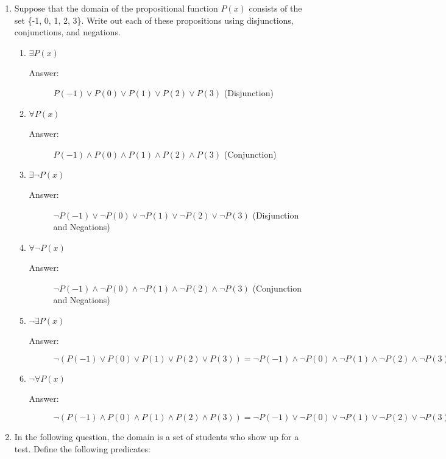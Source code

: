 \documentclass[12pt, oneside]{article}
\begin{document}
\begin{enumerate}
 \item Suppose that the domain of the propositional function $P(x)$ consists of the set \{-1, 0, 1, 2, 3\}. Write out each of these propositions using disjunctions, conjunctions, and negations.
\begin{enumerate}
    \item $\exists P(x) $
    \begin{description}
        \item[Answer:] $P(-1) \lor P(0) \lor P(1) \lor P(2) \lor P(3)$ (Disjunction)
    \end{description}
    \item $\forall P(x)$
    \begin{description}
        \item[Answer:] $P(-1) \land P(0) \land P(1) \land P(2) \land P(3)$ (Conjunction)
    \end{description}
    \item $\exists \neg P(x) $
    \begin{description}
        \item[Answer:] $\lnot P(-1) \lor\lnot P(0) \lor\lnot P(1) \lor\lnot P(2) \lor\lnot P(3)$ (Disjunction and Negations)
    \end{description}
    \item $\forall \neg P(x)$
    \begin{description}
        \item[Answer:] $\lnot P(-1) \land\lnot P(0) \land\lnot P(1) \land\lnot P(2) \land\lnot P(3)$ (Conjunction and Negations)
    \end{description}
    \item $\neg \exists P(x) $
    \begin{description}
        \item[Answer:] $\lnot(P(-1) \lor P(0) \lor P(1) \lor P(2) \lor P(3)) = \lnot P(-1) \land\lnot P(0) \land\lnot P(1) \land\lnot P(2) \land\lnot P(3)$
    \end{description}
    \item $\neg \forall P(x)$
    \begin{description}
        \item[Answer:] $\lnot(P(-1) \land P(0) \land P(1) \land P(2) \land P(3)) = \lnot P(-1) \lor\lnot P(0) \lor\lnot P(1) \lor\lnot P(2) \lor\lnot P(3)$
    \end{description}
\end{enumerate}

\newpage

\item In the following question, the domain is a set of students who show up for a test. Define the following predicates:


\end{enumerate}
\end{document}
